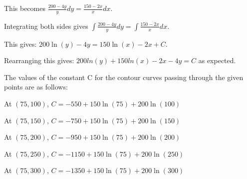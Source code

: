 \documentclass{article}
\begin{document}
This becomes $\frac{200 - 4y}{y} dy = \frac{150 - 2x}{x} dx$.

Integrating both sides gives
$\int \frac{200 - 4y}{y} dy = \int \frac{150 - 2x}{x} dx$.

This gives:
$200 \ln(y) - 4y = 150 \ln(x) - 2x + C$.

Rearranging this gives:
$200 ln(y) + 150 ln(x) - 2x - 4y = C$
as expected.

The values of the constant C for the contour curves passing through
the given points are as follows:

At $(75, 100)$, $C = -550 + 150 \ln(75) + 200 \ln(100)$

At $(75, 150)$, $C = -750 + 150 \ln(75) + 200 \ln(150)$

At $(75, 200)$, $C = -950 + 150 \ln(75) + 200 \ln(200)$

At $(75, 250)$, $C = -1150 + 150 \ln(75) + 200 \ln(250)$

At $(75, 300)$, $C = -1350 + 150 \ln(75) + 200 \ln(300)$
\end{document}

